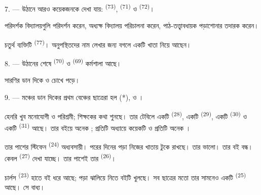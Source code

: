 7. --- উঠানে আরও কয়েকজনকে দেখা যায়: 
\textsuperscript{(73)},  \textsuperscript{(71)} ও 
\textsuperscript{(72)}।

পরিদর্শক বিদ্যালয়গুলি পরিদর্শন করেন, অধ্যক্ষ বিদ্যালয় পরিচালনা করেন,
পাঠ-তত্ত্বাবধায়ক পড়াশোনার তদারক করেন।

চতুর্থ ব্যক্তিটি  \textsuperscript{(77)}। অনুপস্থিতদের নাম
লেখার জন্য বগলে একটি খাতা নিয়ে আছেন।

8. --- উঠানের শেষে  \textsuperscript{(70)} ও
 \textsuperscript{(69)} কর্মশালা আছে।

সারণির ডান দিকে  ও   চোখে
পড়ে।


\VUsaut{2.4mm}

\VUsaut{3.0mm}

9. --- মঞ্চের ডান দিকের প্রথম বেঞ্চের ছাত্রেরা হল  (*),
 ও ।

হেনরি খুব মনোযোগী ও পরিশ্রমী; শিক্ষকের কথা শুনছে। তার টেবিলে একটি
 \textsuperscript{(28)}, একটি  \textsuperscript{(29)}, একটি
 \textsuperscript{(30)} ও একটি 
\textsuperscript{(31)} আছে। তার বইয়ে অনেক ; প্রতিটি অধ্যায়ে
কয়েকটি  ও প্রতিটি  অনেক
।

তার পাশের স্টিফেন \textsuperscript{(24)} অধ্যবসায়ী। পরের দিনের পড়া নিজের
খাতায় টুকে রাখছে। তার  ভালো। তার বই বন্ধ। কেবল
 \textsuperscript{(27)} দেখা যাচ্ছে। তার পাশেই তার
 \textsuperscript{(26)}।

চার্লস \textsuperscript{(23)} হাতে বই ধরে আছে; পড়া ঝালিয়ে নিতে বইটি খুলছে।
সব ছাত্রের মতো তার সামনেও একটি  \textsuperscript{(25)} আছে। সে
বাধ্য।

